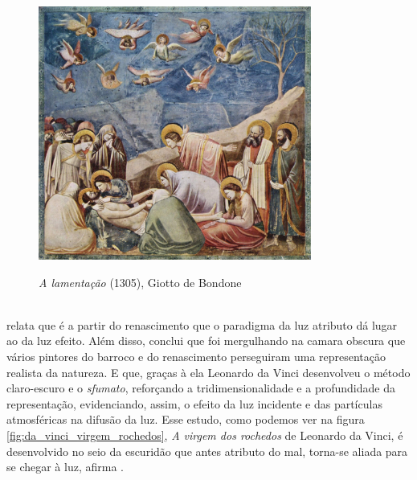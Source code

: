 \begin{figure}[H]
    \centering
    \caption{\textit{A lamentação} (1305), Giotto de Bondone}
	\vspace*{0,2cm}
    \includegraphics[width=0.8\textwidth]{./04-figuras/giotto_lamentacao}
    \label{fig:giotto_lamentacao}
\end{figure}
\vspace*{-0,9cm}
{\raggedright {}}\\

 relata que é a partir do renascimento que o paradigma da luz atributo dá lugar ao da luz efeito. Além disso, conclui que foi mergulhando na camara obscura que vários pintores do barroco e do renascimento perseguiram uma representação realista da natureza. E que, graças à ela Leonardo da Vinci desenvolveu o método claro-escuro e o \textit{sfumato}, reforçando a tridimensionalidade e a profundidade da representação, evidenciando, assim, o efeito da luz incidente e das partículas atmosféricas na difusão da luz. Esse estudo,  como podemos ver na figura \ref{fig:da_vinci_virgem_rochedos}, \textit{A virgem dos rochedos} de Leonardo da Vinci, é desenvolvido no seio da escuridão que antes atributo do mal, torna-se aliada para se chegar à luz, afirma .

